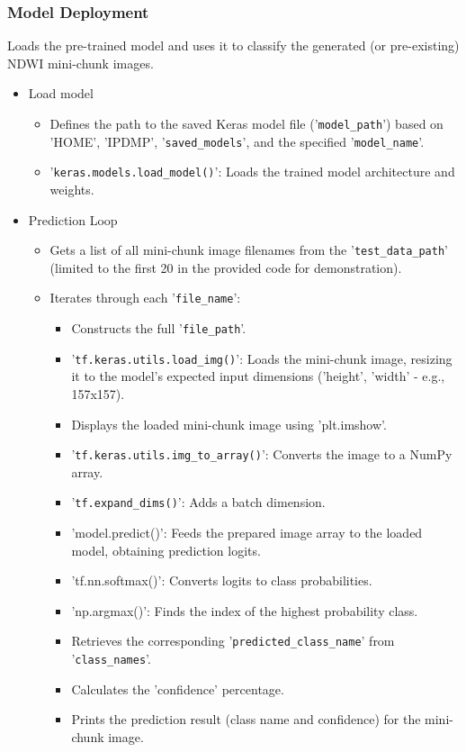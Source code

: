 \subsubsection{Model Deployment}
Loads the pre-trained model and uses it to classify the generated (or pre-existing) NDWI mini-chunk images.
\begin{itemize}
    \item Load model
    \begin{itemize}
        \item Defines the path to the saved Keras model file ('\verb|model_path|') based on 'HOME', 'IPDMP', '\verb|saved_models|', and the specified '\verb|model_name|'.
        \item '\verb|keras.models.load_model()|': Loads the trained model architecture and weights.
    \end{itemize}
    \item Prediction Loop
    \begin{itemize}
        \item Gets a list of all mini-chunk image filenames from the '\verb|test_data_path|' (limited to the first 20 in the provided code for demonstration).
        \item Iterates through each '\verb|file_name|':
        \begin{itemize}
            \item Constructs the full '\verb|file_path|'.
            \item '\verb|tf.keras.utils.load_img()|': Loads the mini-chunk image, resizing it to the model's expected input dimensions ('height', 'width' - e.g., 157x157).
            \item Displays the loaded mini-chunk image using 'plt.imshow'.
            \item '\verb|tf.keras.utils.img_to_array()|': Converts the image to a NumPy array.
            \item '\verb|tf.expand_dims()|': Adds a batch dimension.
            \item 'model.predict()': Feeds the prepared image array to the loaded model, obtaining prediction logits.
            \item 'tf.nn.softmax()': Converts logits to class probabilities.
            \item 'np.argmax()': Finds the index of the highest probability class.
            \item Retrieves the corresponding '\verb|predicted_class_name|' from '\verb|class_names|'.
            \item Calculates the 'confidence' percentage.
            \item Prints the prediction result (class name and confidence) for the mini-chunk image.
        \end{itemize}
    \end{itemize}
\end{itemize}

